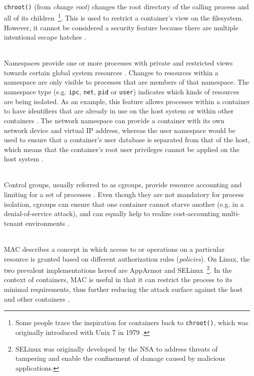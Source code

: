 \begin{description}[format={\storedescriptionlabel}]
  \item[Chroots\label{itm:chroots}]
  \hfill \\
  \texttt{chroot()} (from \textit{ch}ange \textit{root}) changes the root directory of the calling process and all of its children~\footnote{Some people trace the inspiration for containers back to \texttt{chroot()}, which was originally introduced with Unix 7 in 1979 \cite[p.~82]{bernstein2014containers}.}. This is used to restrict a container's view on the filesystem. However, it cannot be considered a security feature because there are multiple intentional escape hatches \cite[p.~3]{eder2016hypervisor}.

  \item[Namespaces]
  \hfill \\
  Namespaces provide one or more processes with private and restricted views towards certain global system resources \cite[p.~387]{morabito2015hypervisors}. Changes to resources within a namespace are only visible to processes that are members of that namespace. The namespace type (e.g. \texttt{ipc}, \texttt{net}, \texttt{pid} or \texttt{user}) indicates which kinds of resources are being isolated. As an example, this feature allows processes within a container to have identifiers that are already in use on the host system or within other containers \cite[p.~3] {eder2016hypervisor}. The network namespace can provide a container with its own network device and virtual \acs{IP} address, whereas the user namespace would be used to ensure that a container's user database is separated from that of the host, which means that the container's root user privileges cannot be applied on the host system \cite[p.~1]{merkel2014docker}.

  \item[Control groups]
  \hfill \\
  Control groups, usually referred to as cgroups, provide resource accounting and limiting for a set of processes  \cite[p.~387]{morabito2015hypervisors} \cite[p.~1]{merkel2014docker}. Even though they are not mandatory for process isolation, cgroups can ensure that one container cannot starve another (e.g. in a denial-of-service attack), and can equally help to realize cost-accounting multi-tenant environments \cite[p.~4]{eder2016hypervisor}.

  \item[\acl{MAC}]
  \hfill \\
  \ac{MAC} describes a concept in which access to or operations on a particular resource is granted based on different authorization rules (\textit{policies}). On Linux, the two prevalent implementations hereof are AppArmor and \acs*{SELinux}~\footnote{\ac*{SELinux} was originally developed by the \acl*{NSA} to address threats of tampering and enable the confinement of damage caused by malicious applications.}. In the context of containers, \ac{MAC} is useful in that it can restrict the process to its minimal requirements, thus further reducing the attack surface against the host and other containers \cite[p.~4]{eder2016hypervisor}.
\end{description}


